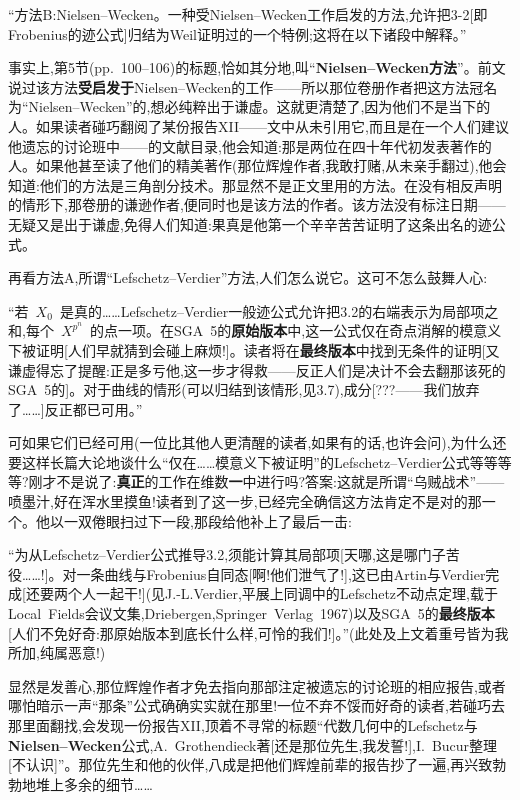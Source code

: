 “方法B:Nielsen--Wecken。一种受Nielsen--Wecken工作启发的方法,允许把3-2[即Frobenius的迹公式]归结为Weil证明过的一个特例;这将在以下诸段中解释。”

事实上,第5节(pp.~100--106)的标题,恰如其分地,叫“\dmark{}\textbf{Nielsen--Wecken方法}”。前文说过该方法\textbf{受启发于}Nielsen--Wecken的工作——所以那位卷册作者把这方法冠名为“Nielsen--Wecken”的,想必纯粹出于谦虚。这就更清楚了,因为他们不是当下的人。如果读者碰巧翻阅了某份报告XII——文中从未引用它,而且是在一个人们建议他遗忘的讨论班中——的文献目录,他会知道:那是两位在四十年代初发表著作的人。如果他甚至读了他们的精美著作(那位辉煌作者,我敢打赌,从未亲手翻过),他会知道:他们的方法是三角剖分技术。那显然不是正文里用的方法。在没有相反声明的情形下,那卷册的谦逊作者,便同时也是该方法的作者。该方法没有标注日期——无疑又是出于谦虚,免得人们知道:果真是他第一个辛辛苦苦证明了这条出名的迹公式。

再看方法A,所谓“Lefschetz--Verdier”方法,人们怎么说它。这可不怎么鼓舞人心:

“若~$X_0$~是真的……Lefschetz--Verdier一般迹公式允许把3.2的右端表示为局部项之和,每个~$X^{p^n}$~的点一项。在SGA~5的\textbf{原始版本}中,这一公式仅在奇点消解的模意义下被证明[人们早就猜到会碰上麻烦!]。读者将在\textbf{最终版本}中找到无条件的证明[又谦虚得忘了提醒:正是多亏他,这一步才得救——反正人们是决计不会去翻那该死的SGA~5的]。对于曲线的情形(可以归结到该情形,见3.7),成分[???——我们放弃了……]反正都已可用。”

可如果它们已经可用(一位比其他人更清醒的读者,如果有的话,也许会问),为什么还要这样长篇大论地谈什么“仅在……模意义下被证明”的Lefschetz--Verdier公式等等等等?刚才不是说了:\textbf{真正}的工作在维数\textbf{一}中进行吗?答案:这就是所谓“乌贼战术”——喷墨汁,好在浑水里摸鱼!读者到了这一步,已经完全确信这方法肯定不是对的那一个。他以一双倦眼扫过下一段,那段给他补上了最后一击:

“为从Lefschetz--Verdier公式推导3.2,须能计算其局部项[天哪,这是哪门子苦役……!]。对一条曲线与Frobenius自同态[啊!他们泄气了!],这已由Artin与Verdier完成[还要两个人一起干!](见J.-L.Verdier,\dmark{}平展上同调中的Lefschetz不动点定理,载于Local~Fields会议文集,Driebergen,Springer~Verlag~1967)以及SGA~5的\textbf{最终版本}[人们不免好奇:那原始版本到底长什么样,可怜的我们!]。”(此处及上文着重号皆为我所加,纯属恶意!)

显然是发善心,那位辉煌作者才免去指向那部注定被遗忘的讨论班的相应报告,或者哪怕暗示一声“那条”公式确确实实就在那里!一位不弃不馁而好奇的读者,若碰巧去那里面翻找,会发现一份报告XII,顶着不寻常的标题“代数几何中的Lefschetz与\textbf{Nielsen--Wecken}公式,A.~Grothendieck著[还是那位先生,我发誓!],I.~Bucur整理[不认识]”。那位先生和他的伙伴,八成是把他们辉煌前辈的报告抄了一遍,再兴致勃勃地堆上多余的细节……

